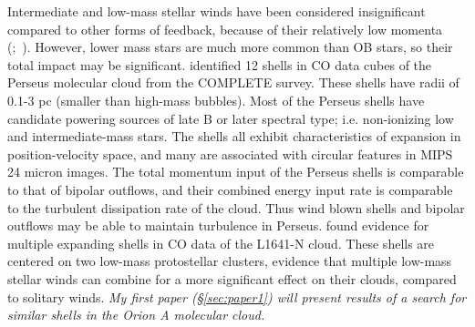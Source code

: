 Intermediate and low-mass stellar winds have been considered insignificant compared to other forms of feedback, because of their relatively low momenta (\citet{Vink01};~\citet{Smith14a}). However, lower mass stars are much more common than OB stars, so their total impact may be significant. \cite{Arce_2011} identified 12 shells in CO data cubes of the Perseus molecular cloud from the COMPLETE survey. These shells have radii of 0.1-3 pc (smaller than high-mass bubbles). Most of the Perseus shells have candidate powering sources of late B or later spectral type; i.e. non-ionizing low and intermediate-mass stars. The shells all exhibit characteristics of expansion in position-velocity space, and many are associated with circular features in MIPS 24 micron images. The total momentum input of the Perseus shells is comparable to that of bipolar outflows, and their combined energy input rate is comparable to the turbulent dissipation rate of the cloud. Thus wind blown shells and bipolar outflows may be able to maintain turbulence in Perseus. \cite{Nakamura12} found evidence for multiple expanding shells in CO data of the L1641-N cloud. These shells are centered on two low-mass protostellar clusters, evidence that multiple low-mass stellar winds can combine for a more significant effect on their clouds, compared to solitary winds. \textit{My first paper (\S\ref{sec:paper1}) will present results of a search for similar shells in the Orion A molecular cloud.}

